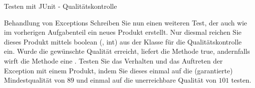 \documentclass{../preamble}
\begin{document}
\begin{task}[credit = \stars{2}{3}]{Testen mit JUnit - Qualitätskontrolle}
    \begin{subtask*}{Behandlung von Exceptions}
        Schreiben Sie nun einen weiteren Test, der auch wie im vorherigen Aufgabenteil ein neues Produkt erstellt. Nur diesmal reichen Sie dieses Produkt mittels \textcolor{keywordcolor}{boolean}  (, \textcolor{keywordcolor}{int}) aus der Klasse  für die Qualitätskontrolle ein. Wurde die gewünschte Qualität erreicht, liefert die Methode \textcolor{keywordcolor}{true},  andernfalls  wirft  die  Methode eine .
        \br
        Testen Sie das Verhalten und das Auftreten der Exception mit einem Produkt, indem Sie dieses einmal auf die (garantierte) Mindestqualität von \(89\) und einmal auf die unerreichbare Qualität von \(101\) testen.

        \begin{solution}
            
        \end{solution}
    \end{subtask*}
\end{task}

\clearpage
\end{document}
